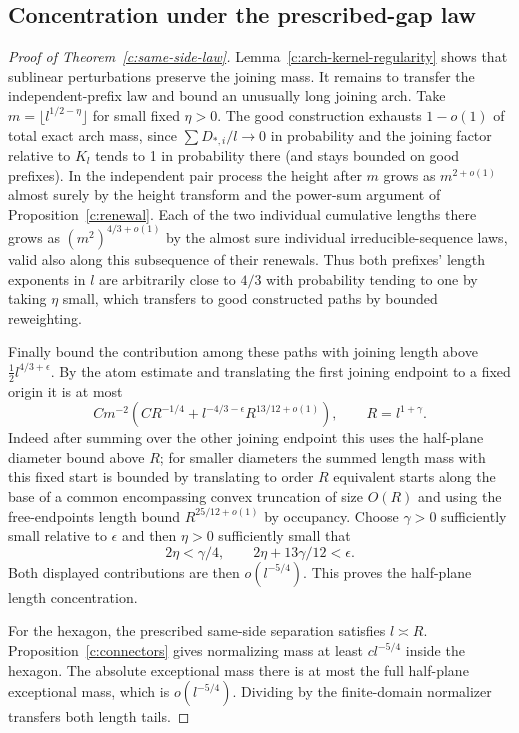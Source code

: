 \documentclass[11pt]{article}
\numberwithin{equation}{section}
\theoremstyle{definition}\newtheorem{definition}[theorem]{Definition}
\theoremstyle{remark}\newtheorem{remark}[theorem]{Remark}
\begin{document}
\subsection{Concentration under the prescribed-gap law}
\begin{proof}[Proof of Theorem~\ref{c:same-side-law}]
Lemma~\ref{c:arch-kernel-regularity} shows that sublinear perturbations preserve the joining mass.
It remains to transfer the independent-prefix law and bound an unusually
long joining arch. Take \(m=\lfloor l^{1/2-\eta}\rfloor\) for small fixed \(\eta>0\). The good construction exhausts \(1-o(1)\) of total exact arch mass, since \(\sum D_{*,i}/l\to0\) in probability and the joining factor relative to \(K_l\) tends to 1 in probability there (and stays bounded on good prefixes). In the independent pair process the height after \(m\) grows as \(m^{2+o(1)}\) almost surely by the height transform and the power-sum argument of Proposition~\ref{c:renewal}. Each of the two individual cumulative lengths there grows as \((m^2)^{4/3+o(1)}\) by the almost sure individual irreducible-sequence laws, valid also along this subsequence of their renewals. Thus both prefixes' length exponents in \(l\) are arbitrarily close to \(4/3\) with probability tending to one by taking \(\eta\) small, which transfers to good constructed paths by bounded reweighting.



Finally bound the contribution among these paths with joining length above \(\tfrac12 l^{4/3+\epsilon}\). By the atom estimate and translating the first joining endpoint to a fixed origin it is at most
\[
 C m^{-2}\left(C R^{-1/4}+l^{-4/3-\epsilon} R^{13/12+o(1)}\right),\qquad R=l^{1+\gamma}.
\]
Indeed after summing over the other joining endpoint this uses the half-plane diameter bound above \(R\); for smaller diameters the summed length mass with this fixed start is bounded by translating to order \(R\) equivalent starts along the base of a common encompassing convex truncation of size \(O(R)\) and using the free-endpoints length bound \(R^{25/12+o(1)}\) by occupancy. Choose \(\gamma>0\) sufficiently small relative to \(\epsilon\) and then \(\eta>0\) sufficiently small that
\[
 2\eta<\gamma/4,\qquad 2\eta+13\gamma/12<\epsilon.
\]
Both displayed contributions are then $o(l^{-5/4})$. This proves the
half-plane length concentration.

For the hexagon, the prescribed same-side separation satisfies $l\asymp R$.
Proposition~\ref{c:connectors} gives normalizing mass at least
$cl^{-5/4}$ inside the hexagon. The absolute exceptional mass there is
at most the full half-plane exceptional mass, which is $o(l^{-5/4})$.
Dividing by the finite-domain normalizer transfers both length tails.

\end{proof}
\end{document}
